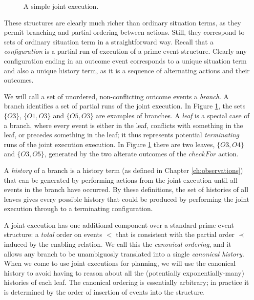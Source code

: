 %
\begin{figure}[t]

\caption{A simple joint execution.}


\label{fig:example-je} 
\end{figure}


These structures are clearly much richer than ordinary situation terms,
as they permit branching and partial-ordering between actions. Still,
they correspond to sets of ordinary situation term in a straightforward
way. Recall that a \emph{configuration} is a partial run of execution
of a prime event structure. Clearly any configuration ending in an
outcome event corresponds to a unique situation term and also a unique
history term, as it is a sequence of alternating actions and their
outcomes.

We will call a set of unordered, non-conflicting outcome events a
\emph{branch}. A branch identifies a set of partial runs of the joint
execution. In Figure \ref{fig:example-je}, the sets $\{O3\}$, $\{O1,O3\}$
and $\{O5,O3\}$ are examples of branches. A \emph{leaf} is a special
case of a branch, where every event is either in the leaf, conflicts
with something in the leaf, or precedes something in the leaf; it
thus represents potential \emph{terminating} runs of the joint execution
execution. In Figure \ref{fig:example-je} there are two leaves, $\{O3,O4\}$
and $\{O3,O5\}$, generated by the two alterate outcomes of the $checkFor$
action.

A \emph{history} of a branch is a history term (as defined in Chapter
\ref{ch:observations}) that can be generated by performing actions
from the joint execution until all events in the branch have occurred.
By these definitions, the set of histories of all leaves gives every
possible history that could be produced by performing the joint execution
through to a terminating configuration.

A joint execution has one additional component over a standard prime
event structure: a \emph{total} order on events $<$ that is consistent
with the partial order $\prec$ induced by the enabling relation.
We call this the \emph{canonical ordering}, and it allows any branch
to be unambiguosly translated into a single \emph{canonical history}.
When we come to use joint executions for planning, we will use the
canonical history to avoid having to reason about all the (potentially
exponentially-many) histories of each leaf. The canonical ordering
is essentially arbitrary; in practice it is determined by the order
of insertion of events into the structure.


